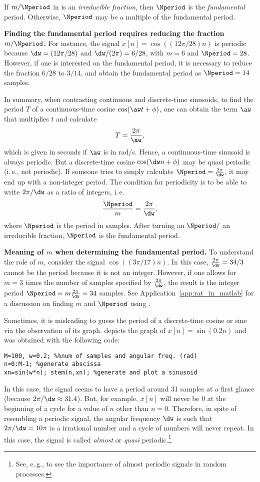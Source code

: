 If $m / \Nperiod$ in  is an \emph{irreducible fraction}, then $\Nperiod$ is the \emph{fundamental} period. Otherwise, $\Nperiod$ may be a multiple of the fundamental period.

\bExample \textbf{Finding the fundamental period requires reducing the fraction $m/\Nperiod$.}
For instance, the signal $x[n]=\cos( (12 \pi/28) n)$ is periodic because $\dw = (12 \pi/28)$ and $\dw/(2\pi) = 6/28$, with $m=6$ and $\Nperiod=28$. However, if one is interested on the fundamental period, it is necessary to reduce the fraction $6/28$ to $3/14$, and obtain the  fundamental period as $\Nperiod = 14$ samples.
\eExample

In summary, when contrasting continuous and discrete-time sinusoids, to find the period $T$ of a continuous-time cosine $\cos(\aw t + \phi)$, one can obtain the term $\aw$ that multiplies $t$ and calculate
\[T= \frac{2 \pi}{\aw},\]
which is given in seconds if $\aw$ is in rad/s. Hence, a continuous-time sinusoid is always periodic. But a discrete-time cosine $\cos(\dw n + \phi)$ may be quasi periodic (i.\,e., not periodic). If someone tries to simply calculate $\Nperiod= \frac{2 \pi}{\dw}$, it may end up with a non-integer period. The condition for periodicity is to be able to write $2 \pi / \dw$ as a ratio of integers, i.\,e.
\[\frac{\Nperiod}{m} = \frac{2 \pi}{\dw},\]
where $\Nperiod$ is the period in samples. After turning an $\Nperiod/$ an irreducible fraction, $\Nperiod$ is the fundamental period.

\bExample \textbf{Meaning of $m$ when determining the fundamental period.}
To understand the role of $m$, consider the signal $\cos( (3\pi/17) n)$. In this case, $\frac{2 \pi}{\dw} = 34/3$ cannot be the period because it is not an integer. However, if one allows for $m=3$ times the number of samples specified by $\frac{2 \pi}{\dw}$, the result is the integer period $\Nperiod=m  \frac{2 \pi}{\dw}=34$ samples. See Application~\ref{app:rat_in_matlab} for a discussion on finding $m$ and $\Nperiod$ using {\matlab}.

Sometimes, it is misleading to guess the period of a discrete-time cosine or sine via the observation of its graph.
 depicts the graph of $x[n]=\sin(0.2n)$ and was obtained with the following code:
\begin{lstlisting}
M=100, w=0.2; %%num of samples and angular freq. (rad)
n=0:M-1; %generate abscissa
xn=sin(w*n); stem(n,xn); %generate and plot a sinusoid
\end{lstlisting}
In this case, the signal seems to have a period around 31 samples at a first glance (because $2 \pi / \dw \approx 31.4$). But, for example, $x[n]$ will never be 0 at the beginning of a cycle for a value of $n$ other than $n=0$. Therefore, in spite of resembling a periodic signal, the angular frequency $\dw$ is such that $2 \pi / \dw = 10 \pi$ is a irrational number and a cycle of numbers will never repeat. In this case, the signal is called \emph{almost} or \emph{quasi} periodic.\footnote{See, e.\,g., \cite{Giannakis99,Antoni07} to see
the importance of almost periodic signals in random processes.}

